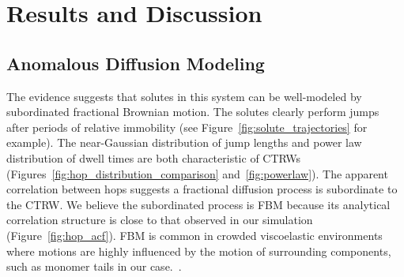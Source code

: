 \documentclass{article}
\begin{document}
  \section{Results and Discussion}

  \subsection{Anomalous Diffusion Modeling}\label{section:sFBM}

  The evidence suggests that solutes in this system can be well-modeled by 
  subordinated fractional Brownian motion. The solutes clearly perform jumps after periods of relative immobility
  (see Figure~\ref{fig:solute_trajectories} for example). The near-Gaussian distribution
  of jump lengths and power law distribution of dwell times are both characteristic of 
  CTRWs (Figures~\ref{fig:hop_distribution_comparison} and~\ref{fig:powerlaw}). The apparent
  correlation between hops suggests a fractional diffusion process is subordinate to the
  CTRW. We believe the subordinated process is FBM because its analytical correlation 
  structure is close to that observed in our simulation (Figure~\ref{fig:hop_acf}). FBM
  is common in crowded viscoelastic environments where motions are highly influenced by
  the motion of surrounding components, such as monomer tails in our case.~\cite{ernst_fractional_2012}.
  
\end{document}
